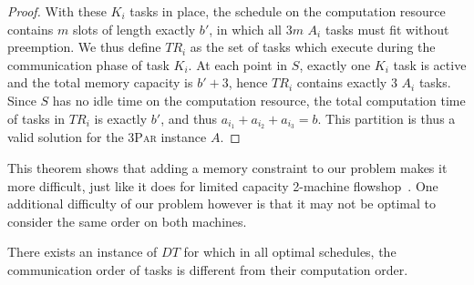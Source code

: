\documentclass[sigconf]{acmart}
\newcommand{\threepart}{\textsc{3Par}\xspace}
\begin{document}
\begin{proof}
		With these $K_i$ tasks in place, the schedule on the computation
		resource contains $m$ slots of length exactly $b'$, in which all $3m$ $A_i$ tasks must fit without preemption. 
		We thus define $TR_i$ as the set of tasks which execute during the communication phase of task $K_i$.  At each point in $S$, exactly one $K_i$ task is active and the total memory capacity is $b' +3$, hence $TR_i$ contains exactly 3 $A_i$ tasks. Since $S$ has no idle time on the computation resource, the total computation time of tasks in $TR_i$ is exactly $b'$, and thus
		$a_{i_1} + a_{i_2} + a_{i_3} = b$. This partition is thus a valid
		solution for the \threepart instance $A$. 
		
	\end{proof}
	
	
	
	This theorem shows that adding a memory constraint to our
	problem makes it more difficult, just like it does for limited capacity 2-machine
	flowshop~\cite{Papadimitriou:1980:FSL:322203.322213}. One additional difficulty of our problem however is that it may not be
	optimal to consider the same order on both machines.
	
	\begin{proposition}
		There exists an instance of $DT$ for which in all optimal
		schedules, the communication order of tasks is different
		from their computation order.
	\end{proposition}
	
\end{document}
